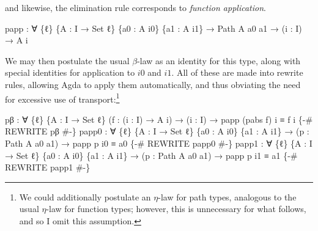 \documentclass[
  12pt]{article}
\newenvironment{Shaded}{\begin{snugshade}}{\end{snugshade}}
\newcommand{\DataTypeTok}[1]{\textcolor[rgb]{0.00,0.34,0.68}{#1}}
\newcommand{\NormalTok}[1]{\textcolor[rgb]{0.12,0.11,0.11}{#1}}
\newcommand{\OtherTok}[1]{\textcolor[rgb]{0.00,0.43,0.16}{#1}}
\newcommand{\PreprocessorTok}[1]{\textcolor[rgb]{0.00,0.43,0.16}{#1}}
\begin{document}
and likewise, the elimination rule corresponds to \emph{function
application}.

\begin{Shaded}
\begin{Highlighting}[]
\NormalTok{    papp }\OtherTok{:} \OtherTok{∀} \OtherTok{\{}\NormalTok{ℓ}\OtherTok{\}} \OtherTok{\{}\NormalTok{A }\OtherTok{:}\NormalTok{ I }\OtherTok{→} \DataTypeTok{Set}\NormalTok{ ℓ}\OtherTok{\}} \OtherTok{\{}\NormalTok{a0 }\OtherTok{:}\NormalTok{ A i0}\OtherTok{\}} \OtherTok{\{}\NormalTok{a1 }\OtherTok{:}\NormalTok{ A i1}\OtherTok{\}}
           \OtherTok{→}\NormalTok{ Path A a0 a1 }\OtherTok{→} \OtherTok{(}\NormalTok{i }\OtherTok{:}\NormalTok{ I}\OtherTok{)} \OtherTok{→}\NormalTok{ A i}
\end{Highlighting}
\end{Shaded}

We may then postulate the usual \(\beta\)-law as an identity for this
type, along with special identities for application to \(i0\) and
\(i1\). All of these are made into rewrite rules, allowing Agda to apply
them automatically, and thus obviating the need for excessive use of
transport:\footnote{We could additionally postulate an \(\eta\)-law for
  path types, analogous to the usual \(\eta\)-law for function types;
  however, this is unnecessary for what follows, and so I omit this
  assumption.}

\begin{Shaded}
\begin{Highlighting}[]
\NormalTok{    pβ }\OtherTok{:} \OtherTok{∀} \OtherTok{\{}\NormalTok{ℓ}\OtherTok{\}} \OtherTok{\{}\NormalTok{A }\OtherTok{:}\NormalTok{ I }\OtherTok{→} \DataTypeTok{Set}\NormalTok{ ℓ}\OtherTok{\}} \OtherTok{(}\NormalTok{f }\OtherTok{:} \OtherTok{(}\NormalTok{i }\OtherTok{:}\NormalTok{ I}\OtherTok{)} \OtherTok{→}\NormalTok{ A i}\OtherTok{)} 
           \OtherTok{→} \OtherTok{(}\NormalTok{i }\OtherTok{:}\NormalTok{ I}\OtherTok{)} \OtherTok{→}\NormalTok{ papp }\OtherTok{(}\NormalTok{pabs f}\OtherTok{)}\NormalTok{ i ≡ f i}
    \PreprocessorTok{\{{-}\# REWRITE pβ \#{-}\}}
\NormalTok{    papp0 }\OtherTok{:} \OtherTok{∀} \OtherTok{\{}\NormalTok{ℓ}\OtherTok{\}} \OtherTok{\{}\NormalTok{A }\OtherTok{:}\NormalTok{ I }\OtherTok{→} \DataTypeTok{Set}\NormalTok{ ℓ}\OtherTok{\}} \OtherTok{\{}\NormalTok{a0 }\OtherTok{:}\NormalTok{ A i0}\OtherTok{\}} \OtherTok{\{}\NormalTok{a1 }\OtherTok{:}\NormalTok{ A i1}\OtherTok{\}} 
            \OtherTok{→} \OtherTok{(}\NormalTok{p }\OtherTok{:}\NormalTok{ Path A a0 a1}\OtherTok{)} \OtherTok{→}\NormalTok{ papp p i0 ≡ a0}
    \PreprocessorTok{\{{-}\# REWRITE papp0 \#{-}\}}
\NormalTok{    papp1 }\OtherTok{:} \OtherTok{∀} \OtherTok{\{}\NormalTok{ℓ}\OtherTok{\}} \OtherTok{\{}\NormalTok{A }\OtherTok{:}\NormalTok{ I }\OtherTok{→} \DataTypeTok{Set}\NormalTok{ ℓ}\OtherTok{\}} \OtherTok{\{}\NormalTok{a0 }\OtherTok{:}\NormalTok{ A i0}\OtherTok{\}} \OtherTok{\{}\NormalTok{a1 }\OtherTok{:}\NormalTok{ A i1}\OtherTok{\}} 
            \OtherTok{→} \OtherTok{(}\NormalTok{p }\OtherTok{:}\NormalTok{ Path A a0 a1}\OtherTok{)} \OtherTok{→}\NormalTok{ papp p i1 ≡ a1}
    \PreprocessorTok{\{{-}\# REWRITE papp1 \#{-}\}}
\end{Highlighting}
\end{Shaded}
\end{document}
